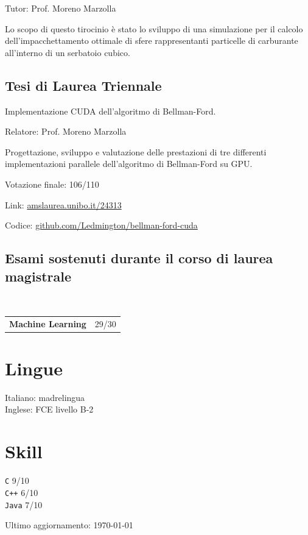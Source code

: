 \documentclass{article}
\newcommand{\https}[1]{\href{https://#1}{#1}}
\newcommand{\skill}[2]{\texttt{#1} #2/10}
\begin{document}
	Tutor: Prof. Moreno Marzolla
	
	Lo scopo di questo tirocinio è stato lo sviluppo di una simulazione per il calcolo dell'impacchettamento ottimale di sfere rappresentanti particelle di carburante all'interno di un serbatoio cubico.
	
	\subsection*{Tesi di Laurea Triennale}
	Implementazione CUDA dell'algoritmo di Bellman-Ford.
	
	Relatore: Prof. Moreno Marzolla
	
	Progettazione, sviluppo e valutazione delle prestazioni di tre differenti implementazioni parallele dell'algoritmo di Bellman-Ford su GPU.
	
	Votazione finale: 106/110
	
	Link: \https{amslaurea.unibo.it/24313}
	
	Codice: \https{github.com/Ledmington/bellman-ford-cuda}
	
	\subsection*{Esami sostenuti durante il corso di laurea magistrale}
	\\
	\begin{tabular}{ll}
		\textbf{Machine Learning} & 29/30\\
	\end{tabular}
	
	\section*{Lingue}
	Italiano: madrelingua\\
	Inglese: FCE livello B-2
	
	\section*{Skill}
	\skill{C}{9}\\
	\skill{C++}{6}\\
	\skill{Java}{7}
	
	\vfill
	\begin{center}
		\scriptsize
		Ultimo aggiornamento: \today
	\end{center}
	
\end{document}
